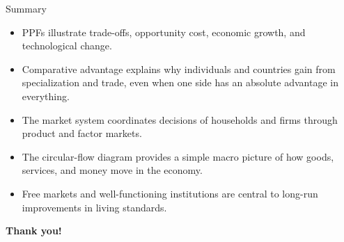 \documentclass[aspectratio=169]{beamer}
\begin{document}
\begin{frame}{Summary}
\transfade
\begin{itemize}[<+->]
  \item PPFs illustrate trade-offs, opportunity cost, economic growth, and technological change.
  \item Comparative advantage explains why individuals and countries gain from specialization and trade, even when one side has an absolute advantage in everything.
  \item The market system coordinates decisions of households and firms through product and factor markets.
  \item The circular-flow diagram provides a simple macro picture of how goods, services, and money move in the economy.
  \item Free markets and well-functioning institutions are central to long-run improvements in living standards.
\end{itemize}
\end{frame}

\begin{frame}
\centering
\Huge \textbf{Thank you!}
\end{frame}
\end{document}
